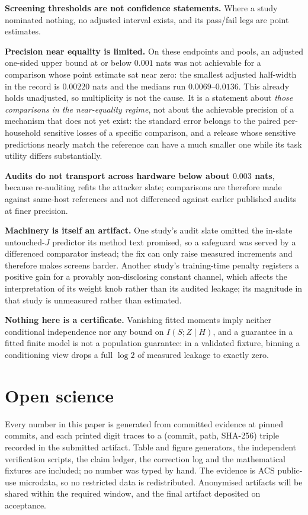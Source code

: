 \documentclass[conference]{IEEEtran}
\begin{document}
\textbf{Screening thresholds are not confidence statements.} Where a study nominated nothing, no adjusted
interval exists, and its pass/fail legs are point estimates.

\textbf{Precision near equality is limited.} On these endpoints and pools, an adjusted one-sided upper
bound at or below $0.001$ nats was not achievable for a comparison whose point estimate sat near zero:
the smallest adjusted half-width in the record is $0.00220$ nats and the medians run $0.0069$--$0.0136$.
This already holds unadjusted, so multiplicity is not the cause. It is a statement about \emph{those
comparisons in the near-equality regime}, not about the achievable precision of a mechanism that does not
yet exist: the standard error belongs to the paired per-household sensitive losses of a specific
comparison, and a release whose sensitive predictions nearly match the reference can have a much smaller
one while its task utility differs substantially.

\textbf{Audits do not transport across hardware below about $0.003$ nats}, because re-auditing refits the
attacker slate; comparisons are therefore made against same-host references and not differenced against
earlier published audits at finer precision.

\textbf{Machinery is itself an artifact.} One study's audit slate omitted the in-slate untouched-$J$
predictor its method text promised, so a safeguard was served by a differenced comparator instead; the
fix can only raise measured increments and therefore makes screens harder. Another study's training-time
penalty registers a positive gain for a provably non-disclosing constant channel, which affects the
interpretation of its weight knob rather than its audited leakage; its magnitude in that study is
unmeasured rather than estimated.

\textbf{Nothing here is a certificate.} Vanishing fitted moments imply neither conditional independence
nor any bound on $I(S;Z\mid H)$, and a guarantee in a fitted finite model is not a population guarantee:
in a validated fixture, binning a conditioning view drops a full $\log 2$ of measured leakage to exactly
zero.

\section{Open science}
\label{sec:openscience}

Every number in this paper is generated from committed evidence at pinned commits, and each printed digit
traces to a (commit, path, SHA-256) triple recorded in the submitted artifact. Table and figure
generators, the independent verification scripts, the claim ledger, the correction log and the
mathematical fixtures are included; no number was typed by hand. The evidence is ACS public-use
microdata, so no restricted data is redistributed. Anonymised artifacts will be shared within the
required window, and the final artifact deposited on acceptance.
\end{document}
